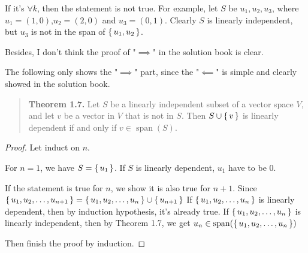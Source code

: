 \documentclass{article}
\newcommand{\0}{\mathit{0}}
\begin{document}
If it's $\forall k$, then the statement is not true. For example,
let $S$ be ${u_1,u_2,u_3}$, where
$u_1=(1,0)$,$u_2=(2,0)$ and $u_3=(0,1)$.
Clearly $S$ is linearly independent, but $u_3$ is not in the span of $\set{u_1,u_2}$.

Besides, I don't think the proof of "$\implies$" in the solution book is clear.

The following only shows the "$\implies$" part,
since the "$\impliedby$"
is simple and clearly showed in the solution book.

\begin{quotation}
    \textbf{Theorem 1.7.} Let $S$ be a linearly independent subset of a vector space
    $V$, and let $v$ be a vector in $V$ that is not in $S$. Then $S \cup \set{v}$
    is linearly dependent if and only if $v \in \operatorname{span}(S)$.
\end{quotation}

\begin{proof}
    Let induct on $n$.

    For $n=1$, we have $S=\set{u_1}$. If $S$ is linearly dependent, $u_1$ have to be $\0$.

    If the statement is true for $n$, we show it is also true for $n+1$.
    Since $\set{u_1,u_2,\dots,u_{n+1}}=\set{u_1,u_2,\dots,u_n}\cup\set{u_{n+1}}$
    If $\set{u_1,u_2,\dots,u_n}$ is linearly dependent, then by induction hypothesis,
    it's already true.
    If $\set{u_1,u_2,\dots,u_n}$ is linearly independent, then by Theorem 1.7, we get
    $u_n\in\operatorname{span}(\set{u_1,u_2,\dots,u_n})$

    Then finish the proof by induction.
\end{proof}
\end{document}
